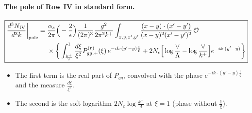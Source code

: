 \documentclass[10pt]{article}
\numberwithin{equation}{section}
\newcommand{\OO}{\mathcal O}
\newcommand{\preLO}{\frac{1}{(2\pi)^3}\frac{g^2}{2\pi^2k^+}}
\newcommand{\XX}{\frac{(x-y)\cdot(x'-y')}{(x-y)^{2}(x'-y')^{2}}}
\newcommand{\ph}{e^{-ik\cdot(y'-y)\frac{1}{\xi}}}
\newcommand{\phone}{e^{-ik\cdot(y'-y)}}
\begin{document}
\paragraph{The pole of Row IV in standard form.}
\begin{equation}
\boxed{\begin{aligned}\frac{d^{3}N_{\rm IV}}{d^{3}k}\bigg|_{\rm pole}={}&\frac{\alpha_s}{2\pi}\Big(-\frac{2}{\epsilon}\Big)\preLO\int_{x,y,x',y'}\XX\,\OO\\
&\times\bigg\{\int_{\frac{k^+}{\vee}}^1\frac{d\xi}{\xi^2}P^{(r)}_{gg,+}(\xi)\,\ph+2N_c\Big[\log\frac{\vee}{\Lambda}-\log\frac{\vee}{k^+}\Big]\phone\bigg\}\end{aligned}}
\label{eq:polestd}
\end{equation}
\begin{itemize}
\item The first term is the real part of $P_{gg}$, convolved with the phase $\ph$ and the measure $\frac{d\xi}{\xi^2}$.
\item The second is the soft logarithm $2N_c\log\frac{k^+}{\Lambda}$ at $\xi=1$ (phase without $\frac1\xi$).
\end{itemize}

\end{document}

